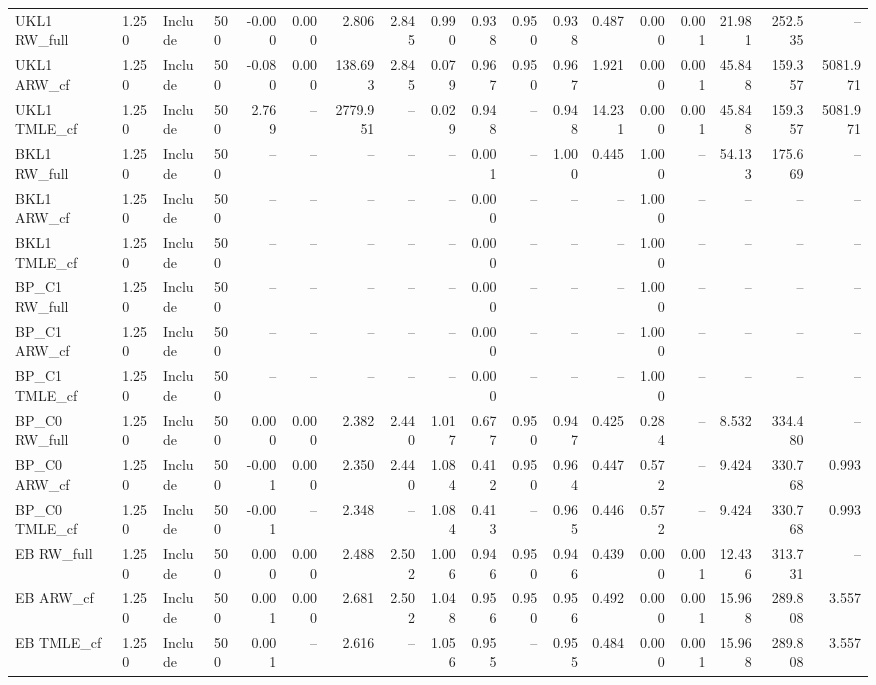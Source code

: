 \begin{tabular}{llllrrrrrrrrrrrrrr}
UKL1 RW\_full & 1.250 & Include & 500 & -0.000 & 0.000 & 2.806 & 2.845 & 0.990 & 0.938 & 0.950 & 0.938 & 0.487 & 0.000 & 0.001 & 21.981 & 252.535 & -- \\
UKL1 ARW\_cf & 1.250 & Include & 500 & -0.080 & 0.000 & 138.693 & 2.845 & 0.079 & 0.967 & 0.950 & 0.967 & 1.921 & 0.000 & 0.001 & 45.848 & 159.357 & 5081.971 \\
UKL1 TMLE\_cf & 1.250 & Include & 500 & 2.769 & -- & 2779.951 & -- & 0.029 & 0.948 & -- & 0.948 & 14.231 & 0.000 & 0.001 & 45.848 & 159.357 & 5081.971 \\
BKL1 RW\_full & 1.250 & Include & 500 & -- & -- & -- & -- & -- & 0.001 & -- & 1.000 & 0.445 & 1.000 & -- & 54.133 & 175.669 & -- \\
BKL1 ARW\_cf & 1.250 & Include & 500 & -- & -- & -- & -- & -- & 0.000 & -- & -- & -- & 1.000 & -- & -- & -- & -- \\
BKL1 TMLE\_cf & 1.250 & Include & 500 & -- & -- & -- & -- & -- & 0.000 & -- & -- & -- & 1.000 & -- & -- & -- & -- \\
BP\_C1 RW\_full & 1.250 & Include & 500 & -- & -- & -- & -- & -- & 0.000 & -- & -- & -- & 1.000 & -- & -- & -- & -- \\
BP\_C1 ARW\_cf & 1.250 & Include & 500 & -- & -- & -- & -- & -- & 0.000 & -- & -- & -- & 1.000 & -- & -- & -- & -- \\
BP\_C1 TMLE\_cf & 1.250 & Include & 500 & -- & -- & -- & -- & -- & 0.000 & -- & -- & -- & 1.000 & -- & -- & -- & -- \\
BP\_C0 RW\_full & 1.250 & Include & 500 & 0.000 & 0.000 & 2.382 & 2.440 & 1.017 & 0.677 & 0.950 & 0.947 & 0.425 & 0.284 & -- & 8.532 & 334.480 & -- \\
BP\_C0 ARW\_cf & 1.250 & Include & 500 & -0.001 & 0.000 & 2.350 & 2.440 & 1.084 & 0.412 & 0.950 & 0.964 & 0.447 & 0.572 & -- & 9.424 & 330.768 & 0.993 \\
BP\_C0 TMLE\_cf & 1.250 & Include & 500 & -0.001 & -- & 2.348 & -- & 1.084 & 0.413 & -- & 0.965 & 0.446 & 0.572 & -- & 9.424 & 330.768 & 0.993 \\
EB RW\_full & 1.250 & Include & 500 & 0.000 & 0.000 & 2.488 & 2.502 & 1.006 & 0.946 & 0.950 & 0.946 & 0.439 & 0.000 & 0.001 & 12.436 & 313.731 & -- \\
EB ARW\_cf & 1.250 & Include & 500 & 0.001 & 0.000 & 2.681 & 2.502 & 1.048 & 0.956 & 0.950 & 0.956 & 0.492 & 0.000 & 0.001 & 15.968 & 289.808 & 3.557 \\
EB TMLE\_cf & 1.250 & Include & 500 & 0.001 & -- & 2.616 & -- & 1.056 & 0.955 & -- & 0.955 & 0.484 & 0.000 & 0.001 & 15.968 & 289.808 & 3.557 \\

\end{tabular}
